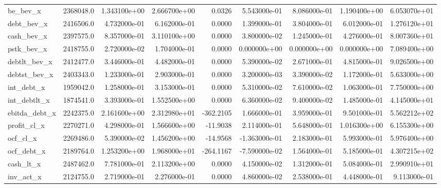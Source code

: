 \documentclass[10pt]{article}
\begin{document}
\begin{landscape}
\begin{longtable}{|l|r|r|r|r|r|r|r|r|}
be\_bev\_x                &  2368048.0 &  1.343100e+00 &  2.666700e+00 &      0.0326 &  5.543000e-01 &  8.086000e-01 &  1.190400e+00 &  6.053070e+01 \\
debt\_bev\_x              &  2416506.0 &  4.732000e-01 &  6.162000e-01 &      0.0000 &  1.399000e-01 &  3.804000e-01 &  6.012000e-01 &  1.276120e+01 \\
cash\_bev\_x              &  2397575.0 &  8.357000e-01 &  3.110100e+00 &      0.0000 &  3.800000e-02 &  1.245000e-01 &  4.276000e-01 &  8.007360e+01 \\
pstk\_bev\_x              &  2418755.0 &  2.720000e-02 &  1.704000e-01 &      0.0000 &  0.000000e+00 &  0.000000e+00 &  0.000000e+00 &  7.089400e+00 \\
debtlt\_bev\_x            &  2412477.0 &  3.446000e-01 &  4.482000e-01 &      0.0000 &  5.390000e-02 &  2.671000e-01 &  4.815000e-01 &  9.026500e+00 \\
debtst\_bev\_x            &  2403343.0 &  1.233000e-01 &  2.903000e-01 &      0.0000 &  3.200000e-03 &  3.390000e-02 &  1.172000e-01 &  5.633000e+00 \\
int\_debt\_x              &  1959042.0 &  1.258000e-01 &  3.153000e-01 &      0.0000 &  5.310000e-02 &  7.610000e-02 &  1.063000e-01 &  7.750000e+00 \\
int\_debtlt\_x            &  1874541.0 &  3.393000e-01 &  1.552500e+00 &      0.0000 &  6.360000e-02 &  9.400000e-02 &  1.485000e-01 &  4.145000e+01 \\
ebitda\_debt\_x           &  2242375.0 &  2.161600e+00 &  2.312980e+01 &   -362.2105 &  1.666000e-01 &  3.959000e-01 &  9.501000e-01 &  5.562212e+02 \\
profit\_cl\_x             &  2270271.0 &  4.298000e-01 &  1.566600e+00 &    -11.9038 &  2.114000e-01 &  5.648000e-01 &  1.016300e+00 &  6.155300e+00 \\
ocf\_cl\_x                &  2269486.0 &  5.390000e-02 &  1.456200e+00 &    -14.9568 & -1.363000e-01 &  2.183000e-01 &  5.993000e-01 &  5.976400e+00 \\
ocf\_debt\_x              &  2189764.0 &  1.253200e+00 &  1.968000e+01 &   -264.1167 & -7.590000e-02 &  1.564000e-01 &  5.185000e-01 &  4.307215e+02 \\
cash\_lt\_x               &  2487462.0 &  7.781000e-01 &  2.113200e+00 &      0.0000 &  4.150000e-02 &  1.312000e-01 &  5.084000e-01 &  2.990910e+01 \\
inv\_act\_x               &  2124755.0 &  2.719000e-01 &  2.276000e-01 &      0.0000 &  4.860000e-02 &  2.538000e-01 &  4.448000e-01 &  9.113000e-01 \\

\end{longtable}
\end{landscape}
\end{document}
